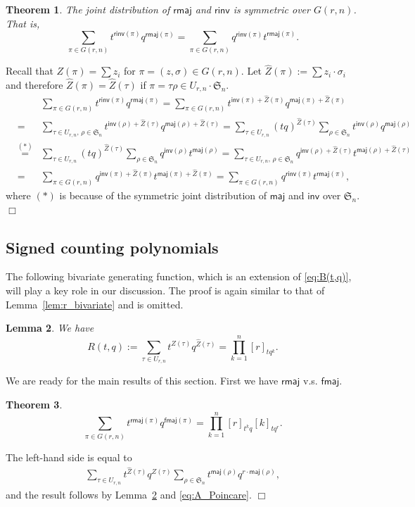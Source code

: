 \documentclass[a4paper, reqno, 11pt]{amsart}
\newtheorem{lem}{Lemma}[section]
\newtheorem{thm}[lem]{Theorem}
\newcommand{\maj}{{\textsf{maj}}}
\newcommand{\inv}{{\textsf{inv}}}
\newcommand{\fmaj}{{\textsf{fmaj}}}
\newcommand{\rmaj}{{\textsf{rmaj}}}
\newcommand{\rinv}{{\textsf{rinv}}}
\numberwithin{equation}{section}
\def\proof{\noindent{\bf Proof.\quad}}
\def\qed{\hspace*{\fill} $\Box$ \medskip}
\begin{document}
\begin{thm}\label{thm_invmaj}
The joint distribution of $\rmaj$ and $\rinv$ is symmetric over $G(r,n)$. 
That is,
$$\sum_{\pi\in G(r,n)}t^{\rinv(\pi)}q^{\rmaj(\pi)}= \sum_{\pi\in G(r,n)}q^{\rinv(\pi)}t^{\rmaj(\pi)}.$$
\end{thm}
\proof 
Recall that $Z(\pi)=\sum z_i$ for $\pi=(z,\sigma)\in G(r,n)$.
Let $\hat{Z}(\pi):=\sum z_i\cdot\sigma_i$ and therefore $\hat{Z}(\pi)=\hat{Z}(\tau)$ if $\pi=\tau\rho\in U_{r,n}\cdot \mathfrak{S}_n$.
\begin{eqnarray*}
&&\sum_{\pi\in G(r,n)}t^{\rinv(\pi)}q^{\rmaj(\pi)}
=\sum_{\pi\in G(r,n)}t^{\inv(\pi)+\hat{Z}(\pi)}q^{\maj(\pi)+\hat{Z}(\pi)}\\
&=&\sum_{\tau\in U_{r,n},\,\rho\in \mathfrak{S}_n}t^{\inv(\rho)+\hat{Z}(\tau)}q^{\maj(\rho)+\hat{Z}(\tau)}
=\sum_{\tau\in U_{r,n}}(tq)^{\hat{Z}(\tau)}\sum_{\rho\in \mathfrak{S}_n}t^{\inv(\rho)}q^{\maj(\rho)}\\
&\stackrel{(*)}{=}&\sum_{\tau\in U_{r,n}}(tq)^{\hat{Z}(\tau)}\sum_{\rho\in \mathfrak{S}_n}q^{\inv(\rho)}t^{\maj(\rho)}
=\sum_{\tau\in U_{r,n},\,\rho\in \mathfrak{S}_n}q^{\inv(\rho)+\hat{Z}(\tau)}t^{\maj(\rho)+\hat{Z}(\tau)}\\
&=&\sum_{\pi\in G(r,n)}q^{\inv(\pi)+\hat{Z}(\pi)}t^{\maj(\pi)+\hat{Z}(\pi)}
=\sum_{\pi\in G(r,n)}q^{\rinv(\pi)}t^{\rmaj(\pi)},
\end{eqnarray*}
where $(*)$ is because of the symmetric joint distribution of $\maj$ and $\inv$ over $\mathfrak{S}_n$. \qed


\subsection{Signed counting polynomials}\label{Sec:FM_Results}
The following bivariate generating function, which is an extension of \eqref{eq:B(t,q)}, will play a key role in our discussion. 
The proof is again similar to that of Lemma~\ref{lem:r_bivariate} and is omitted.

\begin{lem}\label{lem:r&f} We have
$$R(t,q):=\sum_{\tau\in U_{r,n}}t^{Z(\tau)}q^{\hat{Z}(\tau)}=\prod_{k=1}^n[r]_{tq^k}.$$
\end{lem}

We are ready for the main results of this section. 
First we have $\rmaj$ v.s. $\fmaj$.

\begin{thm}\label{thm:fmajrmaj}
$$\sum_{\pi\in G(r,n)}t^{\rmaj(\pi)}q^{\fmaj(\pi)} =\prod_{k=1}^{n}[r]_{t^kq}[k]_{tq^r}.$$
\end{thm}
\proof 
The left-hand side is equal to
\begin{eqnarray*}
\sum_{\tau\in U_{r,n}}t^{\hat{Z}(\tau)}q^{Z(\tau)}\sum_{\rho\in \mathfrak{S}_n}t^{\maj(\rho)}q^{r\cdot\maj(\rho)},
\end{eqnarray*}
and the result follows by Lemma~\ref{lem:r&f} and \eqref{eq:A_Poincare}.
\qed
\end{document}
